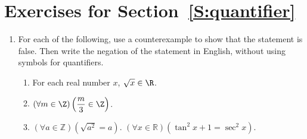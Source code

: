 \section*{Exercises for Section~\ref{S:quantifier}}
\begin{enumerate}
%
\xitem For each of the following, write the statement as an English sentence and then explain why the statement is false.
\label{exer:sec24-1}%
  \begin{enumerate}
    \item $\left(\exists x \in \mathbb{Q} \right) \left( x^2  - 3x - 7 = 0 \right)$.
    \item $\left( \exists x \in \mathbb{R}  \right) \left( x^2  + 1 = 0 \right)$.
    \item $\left( \exists m \in \N \right) \left( m^2 < 1 \right)$.
  \end{enumerate}
%
%
\item For each of the following, use a counterexample to show that the statement is false.  Then write the negation of the statement in English, without using symbols for quantifiers. \label{exer:sec24-2new}
\begin{enumerate}
    \yitem $\left( {\forall m \in \mathbb{Z}} \right)\left( {m^2 \text{ is even}} \right)$.
  \yitem $\left( {\forall x \in \mathbb{R}} \right)\left( {x^2  > 0} \right)$.
  \item For each real number $x$, $\sqrt{x} \in \R$.
  \item $\left( \forall m \in \Z \right) \left( \dfrac{m}{3} \in \Z \right)$.
    \item $\left( {\forall a \in \mathbb{Z}} \right)\left( {\sqrt {a^2 }  = a} \right)$.
    \yitem $\left( {\forall x \in \mathbb{R}} \right)\left( {\tan ^2 x + 1 = \sec ^2 x} \right)$.
\end{enumerate}


\end{enumerate}
